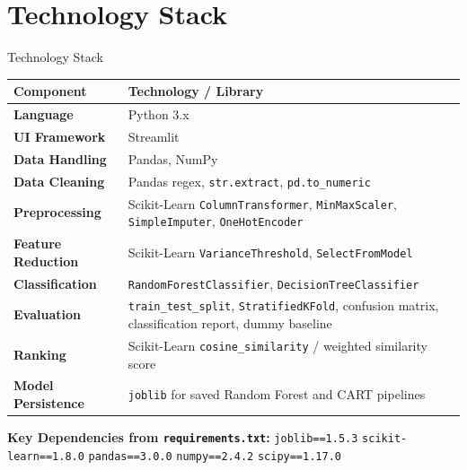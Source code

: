 \documentclass[aspectratio=169]{beamer}
\begin{document}
\section{Technology Stack}
\begin{frame}{Technology Stack}
  \begin{center}
    \renewcommand{\arraystretch}{1.35}
    \begin{tabularx}{0.95\textwidth}{>{\bfseries}lX}
      \toprule
      \textbf{Component}      & \textbf{Technology / Library} \\
      \midrule
      Language                & Python 3.x \\
      UI Framework            & Streamlit \\
      Data Handling           & Pandas, NumPy \\
      Data Cleaning           & Pandas regex, \texttt{str.extract}, \texttt{pd.to\_numeric} \\
      Preprocessing           & Scikit-Learn \texttt{ColumnTransformer}, \texttt{MinMaxScaler}, \texttt{SimpleImputer}, \texttt{OneHotEncoder} \\
      Feature Reduction       & Scikit-Learn \texttt{VarianceThreshold}, \texttt{SelectFromModel} \\
      Classification          & \texttt{RandomForestClassifier}, \texttt{DecisionTreeClassifier} \\
      Evaluation              & \texttt{train\_test\_split}, \texttt{StratifiedKFold}, confusion matrix, classification report, dummy baseline \\
      Ranking                 & Scikit-Learn \texttt{cosine\_similarity} / weighted similarity score \\
      Model Persistence       & \texttt{joblib} for saved Random Forest and CART pipelines \\
      \bottomrule
    \end{tabularx}
  \end{center}
  \vspace{0.5em}
  \small\textbf{Key Dependencies from \texttt{requirements.txt}:}
  \texttt{joblib==1.5.3} \quad \texttt{scikit-learn==1.8.0} \quad \texttt{pandas==3.0.0} \quad
  \texttt{numpy==2.4.2} \quad \texttt{scipy==1.17.0}
\end{frame}

\end{document}
